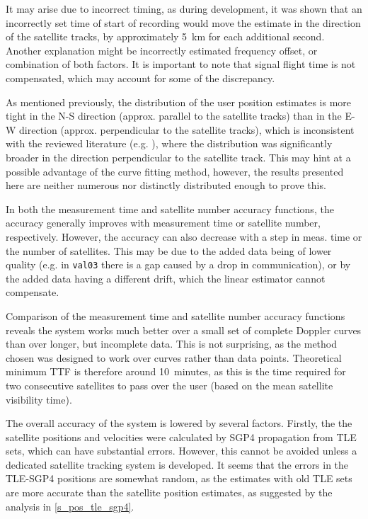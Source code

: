 It may arise due to incorrect timing, as during development, it was shown that an incorrectly set time of start of recording would move the estimate in the direction of the satellite tracks, by approximately \qty{+5}{km} for each additional second. Another explanation might be incorrectly estimated frequency offset, or combination of both factors. It is important to note that signal flight time is not compensated, which may account for some of the discrepancy.

As mentioned previously, the distribution of the user position estimates is more tight in the N-S direction (approx. parallel to the satellite tracks) than in the E-W direction (approx. perpendicular to the satellite tracks), which is inconsistent with the reviewed literature (e.g. \cite{sop10, sop12}), where the distribution was significantly broader in the direction perpendicular to the satellite track. This may hint at a possible advantage of the curve fitting method, however, the results presented here are neither numerous nor distinctly distributed enough to prove this.

In both the measurement time and satellite number accuracy functions, the accuracy generally improves with measurement time or satellite number, respectively. However, the accuracy can also decrease with a step in meas. time or the number of satellites. This may be due to the added data being of lower quality (e.g. in \texttt{val03} there is a gap caused by a drop in communication), or by the added data having a different drift, which the linear estimator cannot compensate.

Comparison of the measurement time and satellite number accuracy functions reveals the system works much better over a small set of complete Doppler curves than over longer, but incomplete data. This is not surprising, as the method chosen was designed to work over curves rather than data points. Theoretical minimum TTF is therefore around \qty{10}{minutes}, as this is the time required for two consecutive satellites to pass over the user (based on the mean satellite visibility time).

The overall accuracy of the system is lowered by several factors. Firstly, the the satellite positions and velocities were calculated by SGP4 propagation from TLE sets, which can have substantial errors. However, this cannot be avoided unless a dedicated satellite tracking system is developed. It seems that the errors in the TLE-SGP4 positions are somewhat random, as the estimates with old TLE sets are more accurate than the satellite position estimates, as suggested by the analysis in \autoref{s_pos_tle_sgp4}.

